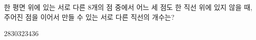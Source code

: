 \hspace*{2mm}\begin{minipage}[t]{\dimexpr\linewidth-2mm\relax}\vspace{0pt}
한 평면 위에 있는 서로 다른 $8$개의 점 중에서 어느 세 점도 한 직선 위에 있지 않을 때, 주어진 점을 이어서 만들 수 있는 서로 다른 직선의 개수는?
\begin{choices32}{$28$}{$30$}{$32$}{$34$}{$36$}\end{choices32}\end{minipage}
